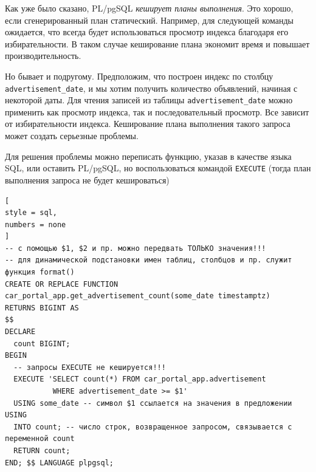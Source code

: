 \documentclass[%
	11pt,
	a4paper,
	utf8,
		]{article}
\begin{document}
Как уже было сказано, PL/pgSQL \emph{кеширует планы выполнения}. Это хорошо, если сгенерированный план статический. Например, для следующей команды ожидается, что всегда будет использоваться просмотр индекса благодаря его избирательности. В таком случае кеширование плана экономит время и повышает производительность.

Но бывает и подругому. Предположим, что построен индекс по столбцу \texttt{advertisement\_date}, и мы хотим получить количество объявлений, начиная с некоторой даты. Для чтения записей из таблицы \texttt{advertisement\_date} можно применить как просмотр индекса, так и последовательный просмотр. Все зависит от избирательности индекса. Кеширование плана выполнения такого запроса может создать серьезные проблемы.

Для решения проблемы можно переписать функцию, указав в качестве языка SQL, или оставить PL/pgSQL, но воспользоваться командой \texttt{EXECUTE} (тогда план выполнения запроса не будет кешироваться)
\begin{lstlisting}[
style = sql,
numbers = none
]
-- с помощью $1, $2 и пр. можно передвать ТОЛЬКО значения!!!
-- для динамической подстановки имен таблиц, столбцов и пр. служит функция format()
CREATE OR REPLACE FUNCTION car_portal_app.get_advertisement_count(some_date timestamptz)
RETURNS BIGINT AS
$$
DECLARE
  count BIGINT;
BEGIN
  -- запросы EXECUTE не кешируется!!!
  EXECUTE 'SELECT count(*) FROM car_portal_app.advertisement
           WHERE advertisement_date >= $1'
  USING some_date -- символ $1 ссылается на значения в предложении USING
  INTO count; -- число строк, возвращенное запросом, связывается с переменной count
  RETURN count;
END; $$ LANGUAGE plpgsql;
\end{lstlisting}
\end{document}
